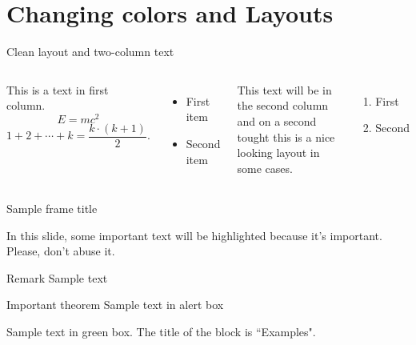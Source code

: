 \documentclass[aspectratio=169,t,xcolor=table]{beamer}
\begin{document}
\section{Changing colors and Layouts}


\begin{frame}{Clean layout and two-column text}
    
    \begin{columns}
    
        This is a text in first column.
        $$E=mc^2$$
        $$ 1 + 2 + \cdots + k =  \frac{k \cdot (k + 1)}{2}.$$
        \begin{itemize}
        \item First item
       
        \item Second item
        \end{itemize}
        
        This text will be in the second column
        and on a second tought this is a nice looking
        layout in some cases.
        
        \begin{enumerate}
            \item First
            \item Second
        \end{enumerate}
        
    \end{columns}
    
\end{frame}


\begin{frame}{Sample frame title}
    
    In this slide, some important text will be
    \alert{highlighted} because it's important. Please, don't abuse it.
    
    \begin{block}{Remark}
        Sample text
    \end{block}
    
    \begin{alertblock}{Important theorem}
        Sample text in alert box
    \end{alertblock}
    
    \begin{examples}
        Sample text in green box. The title of the block is ``Examples".
    \end{examples}
    
\end{frame}
\end{document}
